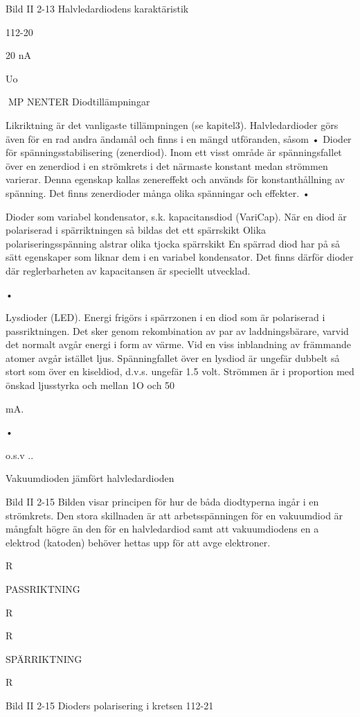 \documentclass[a4paper,twoside,twocolumn,openright]{book}
\begin{document}
{{{Bild II 2-13 Halvledardiodens karaktäristik

112-20

20 nA

Uo

MP NENTER
Diodtillämpningar

Likriktning är det vanligaste tillämpningen
(se kapitel3). Halvledardioder görs även för
en rad andra ändamål och finns i en mängd
utföranden, såsom
• Dioder för spänningsstabilisering (zenerdiod).
Inom ett visst område är spänningsfallet
över en zenerdiod i en strömkrets i det
närmaste konstant medan strömmen varierar. Denna egenskap kallas zenereffekt
och används för konstanthållning av spänning.
Det finns zenerdioder
många olika
spänningar och effekter.
•

Dioder som variabel kondensator, s.k.
kapacitansdiod (VariCap).
När en diod är polariserad i spärriktningen så bildas det ett spärrskikt Olika polariseringsspänning alstrar olika tjocka
spärrskikt En spärrad diod har på så sätt
egenskaper som liknar dem i en variabel
kondensator. Det finns därför dioder där
reglerbarheten av kapacitansen är speciellt utvecklad.

•

Lysdioder (LED).
Energi frigörs i spärrzonen i en diod som
är polariserad i passriktningen. Det sker
genom rekombination av par av laddningsbärare, varvid det normalt avgår
energi i form av värme.
Vid en viss inblandning av främmande
atomer avgår istället ljus. Spänningfallet
över en lysdiod är ungefär dubbelt så
stort som över en kiseldiod, d.v.s. ungefär 1.5 volt. Strömmen är i proportion med
önskad ljusstyrka och mellan 1O och 50

mA.

•

o.s.v ..

Vakuumdioden jämfört halvledardioden

Bild II 2-15
Bilden visar principen för hur de båda diodtyperna ingår i en strömkrets. Den stora
skillnaden är att arbetsspänningen för en
vakuumdiod är mångfalt högre än den för en
halvledardiod samt att vakuumdiodens en a
elektrod (katoden) behöver hettas upp för att
avge elektroner.

R

PASSRIKTNING

R

R

SPÄRRIKTNING

R

Bild II 2-15 Dioders polarisering i kretsen
112-21

}}}
\end{document}
